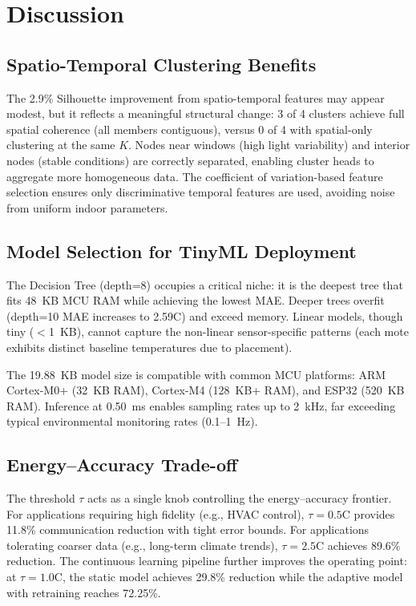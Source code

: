 \documentclass[conference]{IEEEtran}
\begin{document}
\section{Discussion}
\label{sec:discussion}

\subsection{Spatio-Temporal Clustering Benefits}

The 2.9\% Silhouette improvement from spatio-temporal features may appear modest, but it reflects a meaningful structural change: 3 of 4 clusters achieve full spatial coherence (all members contiguous), versus 0 of 4 with spatial-only clustering at the same $K$. Nodes near windows (high light variability) and interior nodes (stable conditions) are correctly separated, enabling cluster heads to aggregate more homogeneous data. The coefficient of variation-based feature selection ensures only discriminative temporal features are used, avoiding noise from uniform indoor parameters.

\subsection{Model Selection for TinyML Deployment}

The Decision Tree (depth=8) occupies a critical niche: it is the deepest tree that fits 48~KB MCU RAM while achieving the lowest MAE. Deeper trees overfit (depth=10 MAE increases to 2.59\textdegree C) and exceed memory. Linear models, though tiny ($<$1~KB), cannot capture the non-linear sensor-specific patterns (each mote exhibits distinct baseline temperatures due to placement).

The 19.88~KB model size is compatible with common MCU platforms: ARM Cortex-M0+ (32~KB RAM), Cortex-M4 (128~KB+ RAM), and ESP32 (520~KB RAM). Inference at 0.50~ms enables sampling rates up to 2~kHz, far exceeding typical environmental monitoring rates (0.1--1~Hz).

\subsection{Energy--Accuracy Trade-off}

The threshold $\tau$ acts as a single knob controlling the energy--accuracy frontier. For applications requiring high fidelity (e.g., HVAC control), $\tau = 0.5$\textdegree C provides 11.8\% communication reduction with tight error bounds. For applications tolerating coarser data (e.g., long-term climate trends), $\tau = 2.5$\textdegree C achieves 89.6\% reduction. The continuous learning pipeline further improves the operating point: at $\tau = 1.0$\textdegree C, the static model achieves 29.8\% reduction while the adaptive model with retraining reaches 72.25\%.
\end{document}
